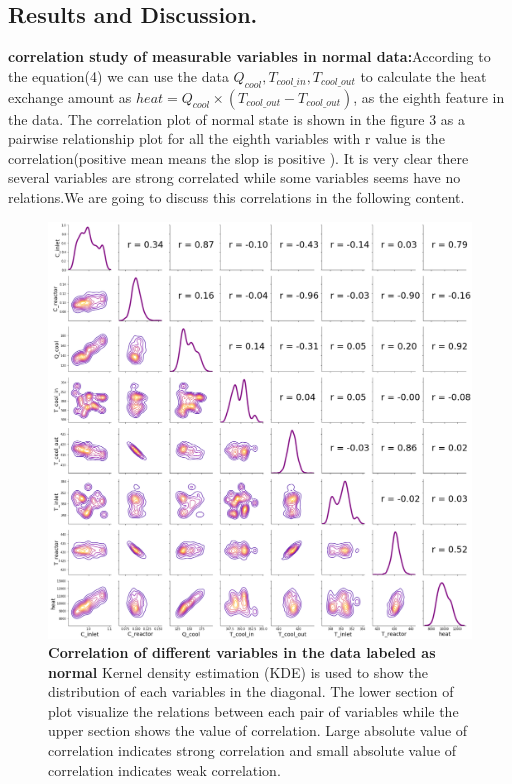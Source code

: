 \documentclass[fleqn,11pt]{wlscirep}
\begin{document}
\subsection*{Results and Discussion.}
\textbf{correlation study of measurable variables in normal data:}According to the equation(4) we can use the data $ Q_{cool}, T_{cool\_in},T_{cool\_out}$ to calculate the heat exchange amount as $heat =Q_{cool}\times( T_{cool\_out}-T_{cool\_out})$, as the eighth feature in the  data. The correlation plot of normal state is shown in the figure 3 as a  pairwise relationship plot for all the eighth variables with r value is the correlation(positive mean means the slop is positive ). It is very clear there several variables are strong correlated while some  variables seems have no relations.We are going to discuss this correlations in the following content.
\begin{figure}[h]
    \centering
    \includegraphics[width=13cm]{figure3.png}
    \caption{
    \textbf{Correlation of different variables in the data labeled as normal  } Kernel density estimation (KDE) is used to show the distribution of each variables in the diagonal. The lower section of plot visualize the  relations between each pair of variables while the upper section shows the  value of correlation. Large absolute value of  correlation indicates strong correlation and   small absolute value of  correlation indicates weak correlation.}
    \label{fig:1}
\end{figure}
\end{document}
